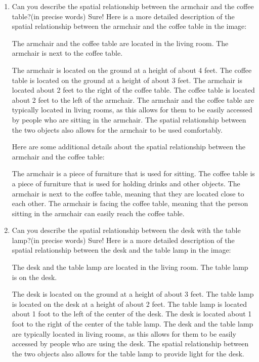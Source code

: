\begin{enumerate}
    \item Can you describe the spatial relationship between the armchair and the coffee table?(in precise words)
    \subitem 
    Sure! Here is a more detailed description of the spatial relationship between the armchair and the coffee table in the image:
    
    The armchair and the coffee table are located in the living room. The armchair is next to the coffee table.
    
    The armchair is located on the ground at a height of about 4 feet.
    The coffee table is located on the ground at a height of about 3 feet.
    The armchair is located about 2 feet to the right of the coffee table.
    The coffee table is located about 2 feet to the left of the armchair.
    The armchair and the coffee table are typically located in living rooms, as this allows for them to be easily accessed by people who are sitting in the armchair. The spatial relationship between the two objects also allows for the armchair to be used comfortably.
    
    Here are some additional details about the spatial relationship between the armchair and the coffee table:
    
    The armchair is a piece of furniture that is used for sitting.
    The coffee table is a piece of furniture that is used for holding drinks and other objects.
    The armchair is next to the coffee table, meaning that they are located close to each other.
    The armchair is facing the coffee table, meaning that the person sitting in the armchair can easily reach the coffee table.
    \item Can you describe the spatial relationship between the desk with the table lamp?(in precise words)
    \subitem Sure! Here is a more detailed description of the spatial relationship between the desk and the table lamp in the image:

    The desk and the table lamp are located in the living room. The table lamp is on the desk.
    
    The desk is located on the ground at a height of about 3 feet.
    The table lamp is located on the desk at a height of about 2 feet.
    The table lamp is located about 1 foot to the left of the center of the desk.
    The desk is located about 1 foot to the right of the center of the table lamp.
    The desk and the table lamp are typically located in living rooms, as this allows for them to be easily accessed by people who are using the desk. The spatial relationship between the two objects also allows for the table lamp to provide light for the desk.
    

\end{enumerate}
